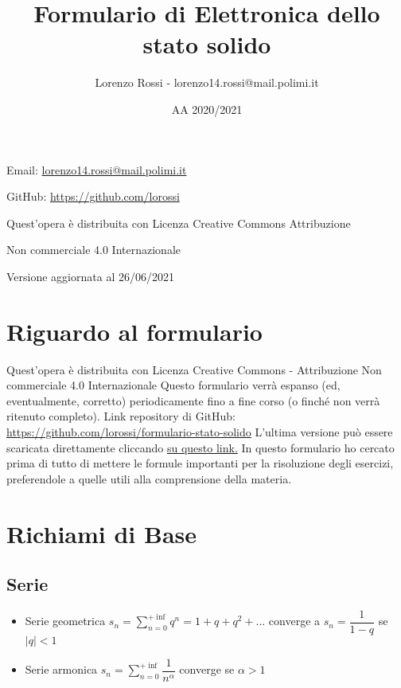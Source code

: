 \documentclass[9pt]{extarticle}
\title{\Huge{Formulario di Elettronica dello stato solido}}
\author{\Huge{Lorenzo Rossi - lorenzo14.rossi@mail.polimi.it}}
\date{\Huge{AA 2020/2021}}
\begin{document}
\maketitle

\vspace{25em}

\begin{doublespacing}\hypersetup{
    urlcolor=black,
  }
  \centerline{\Large{Email: \href{mailto://lorenzo14.rossi@mail.polimi.it}{lorenzo14.rossi@mail.polimi.it}}}
  \centerline{\Large{GitHub: \url{https://github.com/lorossi}}}

  \vspace{25em}

  \centerline{\Large{Quest'opera è distribuita con Licenza Creative Commons Attribuzione}}
  \centerline{\Large{Non commerciale 4.0 Internazionale \ccbynceu}}
  \centerline{\Large{Versione aggiornata al 26/06/2021}}
\end{doublespacing}

\newpage

\tableofcontents
\clearpage
{}
\newpage

\section{Riguardo al formulario}
Quest'opera è distribuita con Licenza Creative Commons - Attribuzione Non commerciale 4.0 Internazionale \ccbynceu \newline
Questo formulario verrà espanso (ed, eventualmente, corretto) periodicamente fino a fine corso (o finché non verrà ritenuto completo). \newline
Link repository di GitHub: \url{https://github.com/lorossi/formulario-stato-solido} \newline
L'ultima versione può essere scaricata direttamente cliccando \href{https://github.com/lorossi/formulario-stato-solido/raw/master/formulario-elettronica-dello-stato-solido.pdf}{su questo link.} \newline
In questo formulario ho cercato prima di tutto di mettere le formule importanti per la risoluzione degli esercizi, preferendole a quelle utili alla comprensione della materia.

\bigskip

\section{Richiami di Base}
\subsection{Serie}
\begin{itemize}
  \item Serie geometrica \( \displaystyle  s_n = \sum_{n=0}^{+\inf} q^n = 1 + q + q^2 + ... \) converge a \( s_n = \dfrac{1}{1-q} \) se \( |q| < 1 \)
  \item Serie armonica \( \displaystyle s_n = \sum_{n=0}^{+\inf} \dfrac{1}{n ^ \alpha} \) converge se \( \alpha > 1 \)
\end{itemize}
\end{document}
